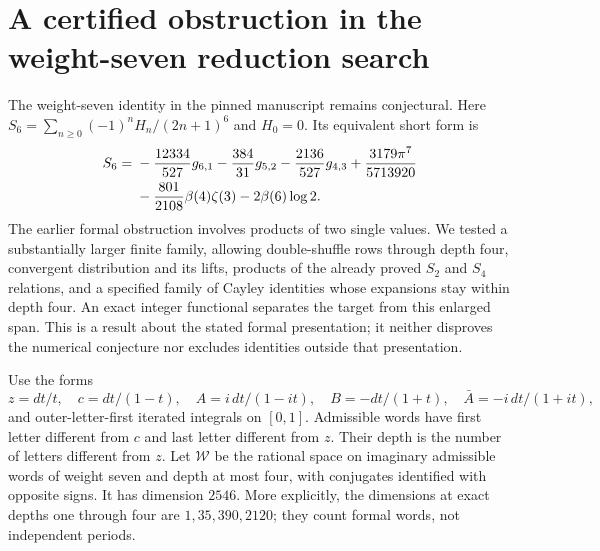 \section{A certified obstruction in the weight-seven reduction search}
\label{s6bounded:sec}

The weight-seven identity in the pinned manuscript \cite{repo} remains conjectural.
Here $S_6=\sum_{n\ge0}(-1)^nH_n/(2n+1)^6$ and $H_0=0$.
Its equivalent short form is
\begin{align}
 S_6={}&-\frac{12334}{527}g_{6,1}-\frac{384}{31}g_{5,2}
 -\frac{2136}{527}g_{4,3}+\frac{3179\pi^7}{5713920}\notag\\
 &-\frac{801}{2108}\beta(4)\zeta(3)-2\beta(6)\log2.
 \label{s6bounded:eq:conjecture}
\end{align}
The earlier formal obstruction involves products of two single values.
We tested a substantially larger finite family, allowing double-shuffle
rows through depth four, convergent distribution and its lifts,
products of the already proved $S_2$ and $S_4$ relations, and a specified
family of Cayley identities whose expansions stay within depth four.
An exact integer functional separates the target from this enlarged
span. This is a result about the stated formal presentation; it neither
disproves the numerical conjecture nor excludes identities outside that
presentation.

Use the forms
\[
 z=dt/t,\quad c=dt/(1-t),\quad
 A=i\,dt/(1-it),\quad B=-dt/(1+t),\quad
 \bar A=-i\,dt/(1+it),
\]
and outer-letter-first iterated integrals on $[0,1]$. Admissible words
have first letter different from $c$ and last letter different from $z$.
Their depth is the number of letters different from $z$. Let $\mathcal W$
be the rational space on imaginary admissible words of weight seven and
depth at most four, with conjugates identified with opposite signs.
It has dimension $2546$. More explicitly, the dimensions at exact
depths one through four are $1,35,390,2120$; they count formal words,
not independent periods.

